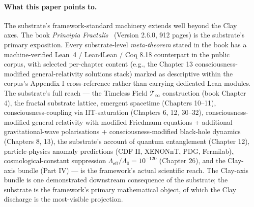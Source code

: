 \documentclass[11pt,a4paper]{amsart}
\theoremstyle{plain}
\theoremstyle{definition}
\begin{document}
\paragraph{What this paper points to.} The substrate's framework-standard machinery extends well beyond the Clay axes. The book \emph{Principia Fractalis}~\cite{cohen2026book} (Version 2.6.0, 912 pages) is the substrate's primary exposition. Every substrate-level \emph{meta-theorem} stated in the book has a machine-verified Lean~4 / Lean4Lean / Coq 8.18 counterpart in the public corpus, with selected per-chapter content (e.g., the Chapter 13 consciousness-modified general-relativity solutions stack) marked as descriptive within the corpus's Appendix I cross-reference rather than carrying dedicated Lean modules. The substrate's full reach --- the Timeless Field $\mathcal{T}_\infty$ construction (book Chapter 4), the fractal substrate lattice, emergent spacetime (Chapters 10--11), consciousness-coupling via IIT-saturation (Chapters 6, 12, 30--32), consciousness-modified general relativity with modified Friedmann equations + additional gravitational-wave polarisations + consciousness-modified black-hole dynamics (Chapters 8, 13), the substrate's account of quantum entanglement (Chapter 12), particle-physics anomaly predictions (CDF II, XENONnT, PDG, Fermilab), cosmological-constant suppression $\Lambda_{\textsf{eff}}/\Lambda_0 = 10^{-120}$ (Chapter 26), and the Clay-axis bundle (Part IV) --- is the framework's actual scientific reach. The Clay-axis bundle is one demonstrated downstream consequence of the substrate; the substrate is the framework's primary mathematical object, of which the Clay discharge is the most-visible projection.
\end{document}
